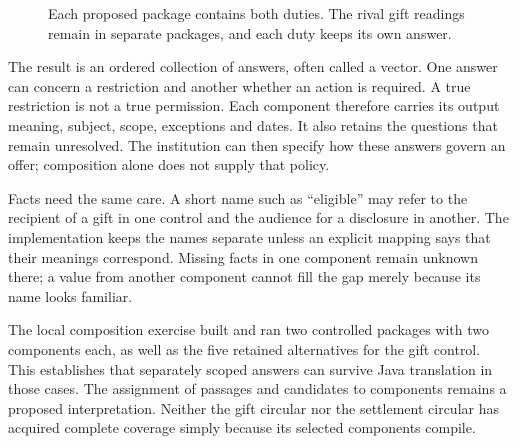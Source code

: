 \begin{figure}[htbp]
\centering
{}
\caption{Each proposed package contains both duties. The rival gift readings
remain in separate packages, and each duty keeps its own answer.}
\label{fig:component-alternatives}
\end{figure}

The result is an ordered collection of answers, often called a vector. One
answer can concern a restriction and another whether an action is required.
A true restriction is not a true permission. Each component therefore carries
its output meaning, subject, scope, exceptions and dates. It also retains the
questions that remain unresolved. The institution can then specify how these
answers govern an offer; composition alone does not supply that policy.

Facts need the same care. A short name such as ``eligible'' may refer to the
recipient of a gift in one control and the audience for a disclosure in another.
The implementation keeps the names separate unless an explicit mapping says
that their meanings correspond. Missing facts in one component remain unknown
there; a value from another component cannot fill the gap merely because its
name looks familiar.

The local composition exercise built and ran two controlled packages with two
components each, as well as the five retained alternatives for the gift
control. This establishes that separately scoped answers can survive Java
translation in those cases. The assignment of passages and candidates to
components remains a proposed interpretation. Neither the gift circular nor
the settlement circular has acquired complete coverage simply because its
selected components compile.

